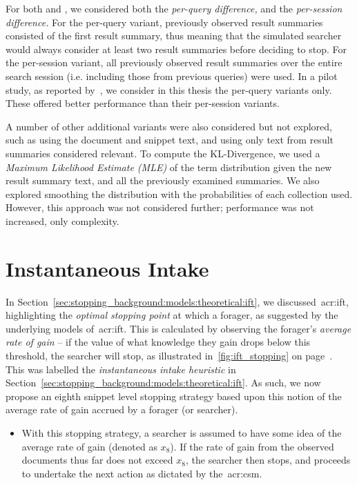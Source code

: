 For both  and , we considered both the \emph{per-query difference,} and the \emph{per-session difference.} For the per-query variant, previously observed result summaries consisted of the first result summary, thus meaning that the simulated searcher would always consider at least two result summaries before deciding to stop. For the per-session variant, all previously observed result summaries over the entire search session (i.e. including those from previous queries) were used. In a pilot study, as reported by~\cite{maxwell2015initial_stopping}, we consider in this thesis the per-query variants only. These offered better performance than their per-session variants.

A number of other additional variants were also considered but not explored, such as using the document and snippet text, and using only text from result summaries considered relevant. To compute the KL-Divergence, we used a \emph{Maximum Likelihood Estimate (MLE)} of the term distribution given the new result summary text, and all the previously examined summaries. We also explored smoothing the distribution with the probabilities of each collection used. However, this approach was not considered further; performance was not increased, only complexity.

\section{Instantaneous Intake}\label{sec:strategies:ift}
In Section~\ref{sec:stopping_background:models:theoretical:ift}, we discussed~\gls{acr:ift}, highlighting the \emph{optimal stopping point} at which a forager, as suggested by the underlying models of~\gls{acr:ift}. This is calculated by observing the forager's \emph{average rate of gain} -- if the value of what knowledge they gain drops below this threshold, the searcher will stop, as illustrated in~\ref{fig:ift_stopping} on page~\pageref{fig:ift_stopping}. This was labelled the \emph{instantaneous intake heuristic} in Section~\ref{sec:stopping_background:models:theoretical:ift}. As such, we now propose an eighth snippet level stopping strategy based upon this notion of the average rate of gain accrued by a forager (or searcher).

\begin{itemize}
    \item{ With this stopping strategy, a searcher is assumed to have some idea of the average rate of gain (denoted as $x_8$). If the rate of gain from the observed documents thus far does not exceed $x_8$, the searcher then stops, and proceeds to undertake the next action as dictated by the~\gls{acr:csm}.}
\end{itemize}

